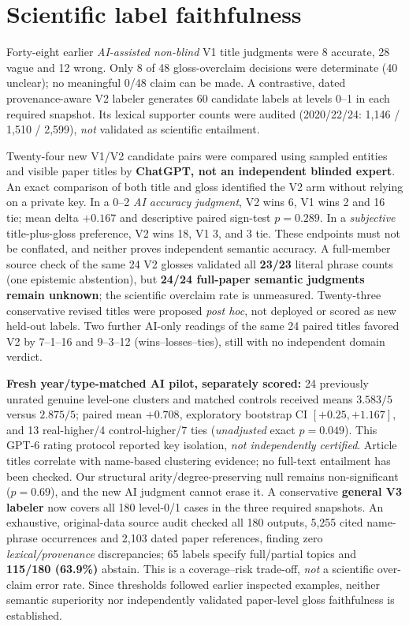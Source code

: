 \documentclass[10pt,twocolumn]{article}
\begin{document}
\section{Scientific label faithfulness}
Forty-eight earlier \emph{AI-assisted non-blind} V1 title judgments were 8 accurate, 28 vague and 12 wrong. Only 8 of 48 gloss-overclaim decisions were determinate (40 unclear); no meaningful 0/48 claim can be made. A contrastive, dated provenance-aware V2 labeler generates 60 candidate labels at levels 0--1 in each required snapshot. Its lexical supporter counts were audited (2020/22/24: 1,146 / 1,510 / 2,599), \emph{not} validated as scientific entailment.

Twenty-four new V1/V2 candidate pairs were compared using sampled entities and visible paper titles by \textbf{ChatGPT, not an independent blinded expert}. An exact comparison of both title and gloss identified the V2 arm without relying on a private key. In a 0--2 \emph{AI accuracy judgment}, V2 wins 6, V1 wins 2 and 16 tie; mean delta \(+0.167\) and descriptive paired sign-test \(p=0.289\). In a \emph{subjective} title-plus-gloss preference, V2 wins 18, V1 3, and 3 tie. These endpoints must not be conflated, and neither proves independent semantic accuracy. A full-member source check of the same 24 V2 glosses validated all \textbf{23/23} literal phrase counts (one epistemic abstention), but \textbf{24/24 full-paper semantic judgments remain unknown}; the scientific overclaim rate is unmeasured. Twenty-three conservative revised titles were proposed \emph{post hoc}, not deployed or scored as new held-out labels. Two further AI-only readings of the same 24 paired titles favored V2 by 7--1--16 and 9--3--12 (wins--losses--ties), still with no independent domain verdict.\par
\textbf{Fresh year/type-matched AI pilot, separately scored:} 24 previously unrated genuine level-one clusters and matched controls received means \(3.583/5\) versus \(2.875/5\); paired mean \(+0.708\), exploratory bootstrap CI \([+0.25,+1.167]\), and 13 real-higher/4 control-higher/7 ties (\emph{unadjusted} exact \(p=0.049\)). This GPT-6 rating protocol reported key isolation, \emph{not independently certified}. Article titles correlate with name-based clustering evidence; no full-text entailment has been checked. Our structural arity/degree-preserving null remains non-significant (\(p=0.69\)), and the new AI judgment cannot erase it. A conservative \textbf{general V3 labeler} now covers all 180 level-0/1 cases in the three required snapshots. An exhaustive, original-data source audit checked all 180 outputs, 5,255 cited name-phrase occurrences and 2,103 dated paper references, finding zero \emph{lexical/provenance} discrepancies; 65 labels specify full/partial topics and \textbf{115/180 (63.9\%)} abstain. This is a coverage--risk trade-off, \emph{not} a scientific over-claim error rate. Since thresholds followed earlier inspected examples, neither semantic superiority nor independently validated paper-level gloss faithfulness is established. \par
\end{document}
